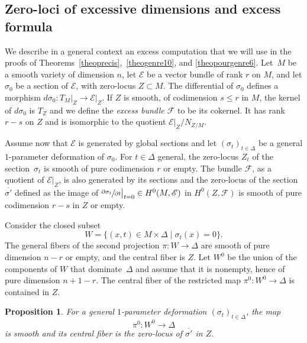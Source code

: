 \documentclass[11pt]{article}
\let\mathcal\mathscr
\newtheorem{prop}[lemm]{Proposition}
\theoremstyle{definition}
\newcommand\cE{\mathcal{E}}
\newcommand\cF{\mathcal{F}}
\begin{document}
\subsection{Zero-loci of excessive dimensions and excess formula}\label{secexcess}
We describe in a general context an excess computation that we will use in the
proofs of Theorems~\ref{theoprecis},~\ref{theogenre10}, and \ref{theopourgenre6}.
Let~$M$ be a smooth variety of dimension $n$, let $\cE$ be a vector bundle of rank $r$ on $M$, and let
$\sigma_0$ be a section of $\cE$, with zero-locus $Z\subset M$. The differential of $\sigma_0$ defines a morphism $d\sigma_0\colon T_M\vert_Z\to \cE\vert_{Z}$. If $Z$ is smooth, of codimension $s\le r $ in $M$,
the kernel of $d\sigma_0$ is $T_Z$ and we define the \emph{excess bundle $\cF$} to be its cokernel. It has rank $r-s$ on $Z$ and is isomorphic to the quotient $\cE\vert_{Z}/N_{Z/M}$.

Assume now that $\cE$ is generated by global sections and let $(\sigma_t)_{t\in \Delta}$ be a general $1$-parameter deformation of $\sigma_0$. For $t\in \Delta$ general, the zero-locus $Z_t$ of the section~$\sigma_t$ is smooth of pure codimension
$r$ {or empty}. The bundle $\cF$, as a quotient of $\cE\vert_Z$, is also generated by its sections and
the zero-locus of the section
$\overline {\sigma'} $ defined as the image of $\sfrac{\partial\sigma_t}{\partial t} \big\vert_{t=0}\in H^0(M,\cE)$ in
$H^0(Z,\cF)$ is smooth of pure codimension $r-s$ in $Z$ {or empty}.

Consider the closed subset
\begin{equation}\label{eqW}
W=\{(x,t)\in M\times \Delta\mid \sigma_t(x)=0\}.
\end{equation}
The general fibers of the second projection $\pi\colon W\to \Delta$ are smooth of pure dimension
$n-r$ {or empty,} and the central fiber is $Z$. {Let $W^0$ be the union of the components of $W$ that dominate~$\Delta$ and assume that it is nonempty, hence of pure dimension
$n+1-r$}. The central fiber of the restricted map $\pi^0\colon W^0\to \Delta$ is contained in $Z$.

\begin{prop}\label{proexcess}
For a general $1$-parameter deformation $(\sigma_t)_{t\in \Delta}$, the map
\[
\pi^0\colon W^0\to \Delta
\]
is smooth and its central fiber is the zero-locus of $\overline {\sigma'} $ in $Z$.
\end{prop}
\end{document}
